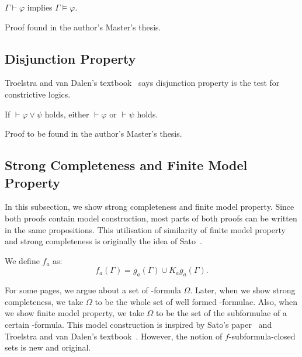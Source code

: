   \begin{proposition}[Soundness]
   \label{soundness}
   $\Gamma\vdash\varphi$ implies $\Gamma\models\varphi$.
  \end{proposition}
  Proof found in the author's Master's thesis.

  \subsection{Disjunction Property}

  Troelstra and van Dalen's
  textbook~\cite[3.5]{troelstra1988constructivism} says
  disjunction property is the test for constrictive logics.

   \begin{proposition}
    \label{disjunction-property}
    If $\vdash\varphi\vee\psi$ holds, either $\vdash\varphi$ or $\vdash\psi$ holds.
   \end{proposition}
   Proof to be found in the author's Master's thesis.

  \subsection{Strong Completeness and Finite Model Property}

  In this subsection, we show strong completeness and finite model property.
  Since both proofs contain model construction,
  most parts of both proofs can be written in the same propositions.
  This utilisation of similarity of finite model property and strong completeness
  is originally the idea of
  Sato~\cite{sato13study}.

  \begin{definition}
   We define $f_a$ as:
   \[
   f_a(\Gamma) = g_a(\Gamma) \cup K_ag_a(\Gamma).
   \]
  \end{definition}

  For some pages, we argue about a
  set of \iec-formula $\Omega$. Later, when we show
  strong completeness, we take $\Omega$ to be the whole set of well formed \iec-formulae.  Also,
  when we show finite model property, we take $\Omega$ to be the set of the subformulae of a
  certain \iec-formula.  This model construction is inspired by
  Sato's paper~\cite{sato13study}
  and Troelstra and van Dalen's textbook~\cite{troelstra1988constructivism}.
  However, the notion of $f$-subformula-closed sets is new and original.

